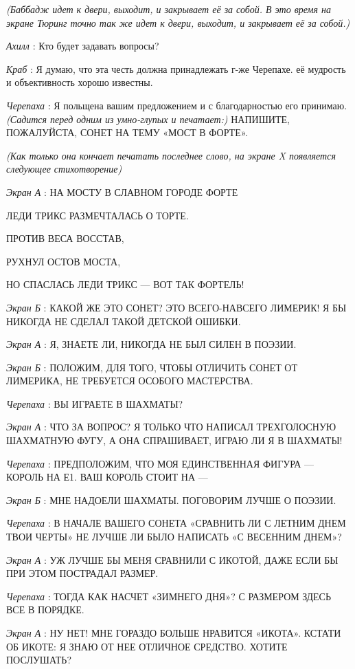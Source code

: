 \documentclass[../main.tex]{subfiles}
\begin{document}
\begin{dialogue}
\emph{(Баббадж идет к двери, выходит, и закрывает её за собой. В это время на экране Тюринг точно так же идет к двери, выходит, и закрывает её за собой.)}

\emph{Ахилл} : Кто будет задавать вопросы?

\emph{Краб} : Я думаю, что эта честь должна принадлежать г-же Черепахе. её мудрость и объективность хорошо известны.

\emph{Черепаха} : Я польщена вашим предложением и с благодарностью его принимаю. \emph{(Садится перед одним из умно-глупых и печатает:)} НАПИШИТЕ, ПОЖАЛУЙСТА, СОНЕТ НА ТЕМУ «МОСТ В ФОРТЕ».

\emph{(Как только она кончает печатать последнее слово, на экране X появляется следующее стихотворение)}

\emph{Экран А} : НА МОСТУ В СЛАВНОМ ГОРОДЕ ФОРТЕ

ЛЕДИ ТРИКС РАЗМЕЧТАЛАСЬ О ТОРТЕ.

ПРОТИВ ВЕСА ВОССТАВ,

РУХНУЛ ОСТОВ МОСТА,

НО СПАСЛАСЬ ЛЕДИ ТРИКС --- ВОТ ТАК ФОРТЕЛЬ!

\emph{Экран Б} : КАКОЙ ЖЕ ЭТО СОНЕТ? ЭТО ВСЕГО-НАВСЕГО ЛИМЕРИК! Я БЫ НИКОГДА НЕ СДЕЛАЛ ТАКОЙ ДЕТСКОЙ ОШИБКИ.

\emph{Экран А} : Я, ЗНАЕТЕ ЛИ, НИКОГДА НЕ БЫЛ СИЛЕН В ПОЭЗИИ.

\emph{Экран Б} : ПОЛОЖИМ, ДЛЯ ТОГО, ЧТОБЫ ОТЛИЧИТЬ СОНЕТ ОТ ЛИМЕРИКА, НЕ ТРЕБУЕТСЯ ОСОБОГО МАСТЕРСТВА.

\emph{Черепаха} : ВЫ ИГРАЕТЕ В ШАХМАТЫ?

\emph{Экран А} : ЧТО ЗА ВОПРОС? Я ТОЛЬКО ЧТО НАПИСАЛ ТРЕХГОЛОСНУЮ ШАХМАТНУЮ ФУГУ, А ОНА СПРАШИВАЕТ, ИГРАЮ ЛИ Я В ШАХМАТЫ!

\emph{Черепаха} : ПРЕДПОЛОЖИМ, ЧТО МОЯ ЕДИНСТВЕННАЯ ФИГУРА --- КОРОЛЬ НА Е1. ВАШ КОРОЛЬ СТОИТ НА ---

\emph{Экран Б} : МНЕ НАДОЕЛИ ШАХМАТЫ. ПОГОВОРИМ ЛУЧШЕ О ПОЭЗИИ.

\emph{Черепаха} : В НАЧАЛЕ ВАШЕГО СОНЕТА «СРАВНИТЬ ЛИ С ЛЕТНИМ ДНЕМ ТВОИ ЧЕРТЫ» НЕ ЛУЧШЕ ЛИ БЫЛО НАПИСАТЬ «С ВЕСЕННИМ ДНЕМ»?

\emph{Экран А} : УЖ ЛУЧШЕ БЫ МЕНЯ СРАВНИЛИ С ИКОТОЙ, ДАЖЕ ЕСЛИ БЫ ПРИ ЭТОМ ПОСТРАДАЛ РАЗМЕР.

\emph{Черепаха} : ТОГДА КАК НАСЧЕТ «ЗИМНЕГО ДНЯ»? С РАЗМЕРОМ ЗДЕСЬ ВСЕ В ПОРЯДКЕ.

\emph{Экран А} : НУ НЕТ! МНЕ ГОРАЗДО БОЛЬШЕ НРАВИТСЯ «ИКОТА». КСТАТИ ОБ ИКОТЕ: Я ЗНАЮ ОТ НЕЕ ОТЛИЧНОЕ СРЕДСТВО. ХОТИТЕ ПОСЛУШАТЬ?


\end{dialogue}
\end{document}

